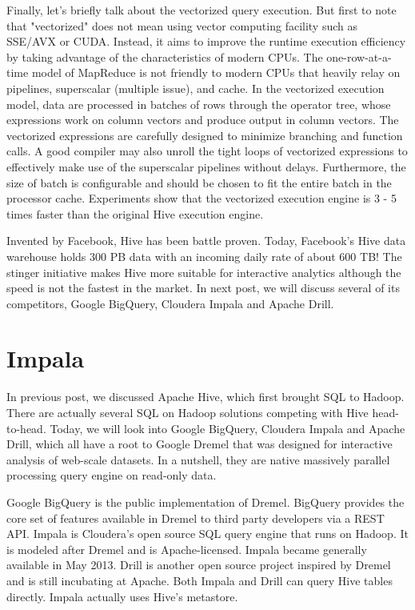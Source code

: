 \documentclass[11pt]{book}
\begin{document}
Finally, let's briefly talk about the vectorized query execution. But first to note that "vectorized" does not mean using vector computing facility such as SSE/AVX or CUDA. Instead, it aims to improve the runtime execution efficiency by taking advantage of the characteristics of modern CPUs. The one-row-at-a-time model of MapReduce is not friendly to modern CPUs that heavily relay on pipelines, superscalar (multiple issue), and cache. In the vectorized execution model, data are processed in batches of rows through the operator tree, whose expressions work on column vectors and produce output in column vectors. The vectorized expressions are carefully designed to minimize branching and function calls. A good compiler may also unroll the tight loops of vectorized expressions to effectively make use of the superscalar pipelines without delays. Furthermore, the size of batch is configurable and should be chosen to fit the entire batch in the processor cache. Experiments show that the vectorized execution engine is 3 - 5 times faster than the original Hive execution engine.

Invented by Facebook, Hive has been battle proven. Today, Facebook's Hive data warehouse holds 300 PB data with an incoming daily rate of about 600 TB! The stinger initiative makes Hive more suitable for interactive analytics although the speed is not the fastest in the market. In next post, we will discuss several of its competitors, Google BigQuery, Cloudera Impala and Apache Drill.

\section{Impala}
In previous post, we discussed Apache Hive, which first brought SQL to Hadoop. There are actually several SQL on Hadoop solutions competing with Hive head-to-head. Today, we will look into Google BigQuery, Cloudera Impala and Apache Drill, which all have a root to Google Dremel that was designed for interactive analysis of web-scale datasets. In a nutshell, they are native massively parallel processing query engine on read-only data.

Google BigQuery is the public implementation of Dremel. BigQuery provides the core set of features available in Dremel to third party developers via a REST API. Impala is Cloudera's open source SQL query engine that runs on Hadoop. It is modeled after Dremel and is Apache-licensed. Impala became generally available in May 2013. Drill is another open source project inspired by Dremel and is still incubating at Apache. Both Impala and Drill can query Hive tables directly. Impala actually uses Hive's metastore.
\end{document}
